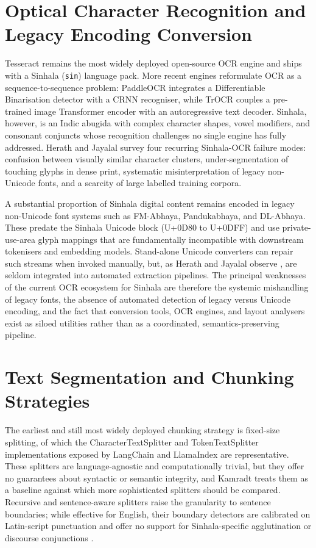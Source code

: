 \documentclass[12pt,a4paper,oneside]{report}
\begin{document}
\section{Optical Character Recognition and Legacy Encoding Conversion}
\label{sec:lit-ocr}
Tesseract \cite{smith2007tesseract} remains the most widely deployed open-source OCR engine and ships with a Sinhala (\texttt{sin}) language pack. More recent engines reformulate OCR as a sequence-to-sequence problem: PaddleOCR \cite{du2020paddleocr} integrates a Differentiable Binarisation detector with a CRNN recogniser, while TrOCR \cite{li2023trocr} couples a pre-trained image Transformer encoder with an autoregressive text decoder. Sinhala, however, is an Indic abugida with complex character shapes, vowel modifiers, and consonant conjuncts whose recognition challenges no single engine has fully addressed. Herath and Jayalal \cite{herath2021sinhala} survey four recurring Sinhala-OCR failure modes: confusion between visually similar character clusters, under-segmentation of touching glyphs in dense print, systematic misinterpretation of legacy non-Unicode fonts, and a scarcity of large labelled training corpora.

A substantial proportion of Sinhala digital content remains encoded in legacy non-Unicode font systems such as FM-Abhaya, Pandukabhaya, and DL-Abhaya. These predate the Sinhala Unicode block (U+0D80 to U+0DFF) and use private-use-area glyph mappings that are fundamentally incompatible with downstream tokenisers and embedding models. Stand-alone Unicode converters \cite{webapps2025converter} can repair such streams when invoked manually, but, as Herath and Jayalal observe \cite{herath2021sinhala}, are seldom integrated into automated extraction pipelines. The principal weaknesses of the current OCR ecosystem for Sinhala are therefore the systemic mishandling of legacy fonts, the absence of automated detection of legacy versus Unicode encoding, and the fact that conversion tools, OCR engines, and layout analysers exist as siloed utilities rather than as a coordinated, semantics-preserving pipeline.

\section{Text Segmentation and Chunking Strategies}
\label{sec:lit-chunking}
The earliest and still most widely deployed chunking strategy is fixed-size splitting, of which the CharacterTextSplitter and TokenTextSplitter implementations exposed by LangChain \cite{langchain2024} and LlamaIndex \cite{llamaindex2024} are representative. These splitters are language-agnostic and computationally trivial, but they offer no guarantees about syntactic or semantic integrity, and Kamradt \cite{kamradt2024chunking} treats them as a baseline against which more sophisticated splitters should be compared. Recursive and sentence-aware splitters raise the granularity to sentence boundaries; while effective for English, their boundary detectors are calibrated on Latin-script punctuation and offer no support for Sinhala-specific agglutination or discourse conjunctions \cite{pathirana2025sinmorphy, ruwanpathirana2015sentence}.
\end{document}
